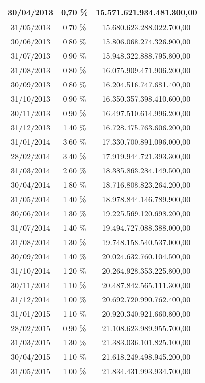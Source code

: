 \begin{center}
\begin{longtable}{|c|c|c|}
30/04/2013 & 0,70 \% & 15.571.621.934.481.300,00  \\ \hline
31/05/2013 & 0,70 \% & 15.680.623.288.022.700,00  \\ \hline
30/06/2013 & 0,80 \% & 15.806.068.274.326.900,00  \\ \hline
31/07/2013 & 0,90 \% & 15.948.322.888.795.800,00  \\ \hline
31/08/2013 & 0,80 \% & 16.075.909.471.906.200,00  \\ \hline
30/09/2013 & 0,80 \% & 16.204.516.747.681.400,00  \\ \hline
31/10/2013 & 0,90 \% & 16.350.357.398.410.600,00  \\ \hline
30/11/2013 & 0,90 \% & 16.497.510.614.996.200,00  \\ \hline
31/12/2013 & 1,40 \% & 16.728.475.763.606.200,00  \\ \hline
31/01/2014 & 3,60 \% & 17.330.700.891.096.000,00  \\ \hline
28/02/2014 & 3,40 \% & 17.919.944.721.393.300,00  \\ \hline
31/03/2014 & 2,60 \% & 18.385.863.284.149.500,00  \\ \hline
30/04/2014 & 1,80 \% & 18.716.808.823.264.200,00  \\ \hline
31/05/2014 & 1,40 \% & 18.978.844.146.789.900,00  \\ \hline
30/06/2014 & 1,30 \% & 19.225.569.120.698.200,00  \\ \hline
31/07/2014 & 1,40 \% & 19.494.727.088.388.000,00  \\ \hline
31/08/2014 & 1,30 \% & 19.748.158.540.537.000,00  \\ \hline
30/09/2014 & 1,40 \% & 20.024.632.760.104.500,00  \\ \hline
31/10/2014 & 1,20 \% & 20.264.928.353.225.800,00  \\ \hline
30/11/2014 & 1,10 \% & 20.487.842.565.111.300,00  \\ \hline
31/12/2014 & 1,00 \% & 20.692.720.990.762.400,00  \\ \hline
31/01/2015 & 1,10 \% & 20.920.340.921.660.800,00  \\ \hline
28/02/2015 & 0,90 \% & 21.108.623.989.955.700,00  \\ \hline
31/03/2015 & 1,30 \% & 21.383.036.101.825.100,00  \\ \hline
30/04/2015 & 1,10 \% & 21.618.249.498.945.200,00  \\ \hline
31/05/2015 & 1,00 \% & 21.834.431.993.934.700,00  \\ \hline

\end{longtable}
\end{center}

